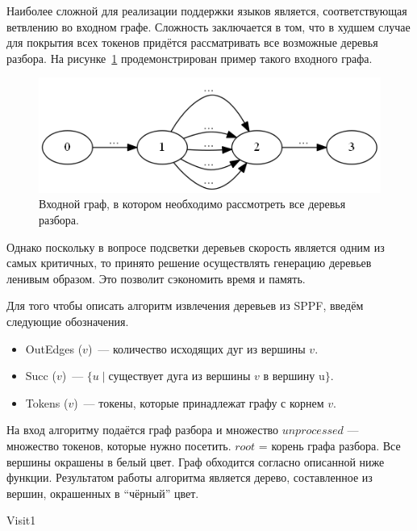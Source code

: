 Наиболее сложной для реализации поддержки языков является, соответствующая ветвлению во входном графе. Сложность заключается в том, что в худшем случае для покрытия всех токенов придётся рассматривать все возможные деревья разбора. На рисунке~\ref{bad_case} продемонстрирован пример такого входного графа. 

\begin{figure}[t]
\centering
\includegraphics[width=0.7\linewidth]{Ivanov/Pictures/bad_case.png}
\caption{Входной граф, в котором необходимо рассмотреть все деревья разбора.}
\label{bad_case}
\end{figure}

Однако поскольку в вопросе подсветки деревьев скорость является одним из самых критичных, то принято решение осуществлять генерацию деревьев ленивым образом. Это позволит сэкономить время и память. 

Для того чтобы описать алгоритм извлечения деревьев из SPPF, введём следующие обозначения.
\begin{itemize}
\item OutEdges ($v$)~--- количество исходящих дуг из вершины $v$. 
\item Succ ($v$)~--- $\{u \mid \mbox{существует дуга из вершины } v \mbox{ в вершину u} \}$.
\item Tokens ($v$)~--- токены, которые принадлежат графу с корнем $v$.
\end{itemize}

На вход алгоритму подаётся граф разбора и множество $unprocessed$ --- множество токенов, которые нужно посетить. $root$ = корень графа разбора. Все вершины окрашены в белый цвет. Граф обходится согласно описанной ниже функции. Результатом работы алгоритма  является дерево, составленное из вершин, окрашенных в ``чёрный'' цвет.

\begin{algorithm}
\begin{algorithmic}[1]
        \State {}
    \Else 
        \State {}
    \EndIf
  \Else
       \State {}
   \EndFor
  \EndIf
\EndFunction

\end{algorithmic}
\caption{Visit1}
\end{algorithm}

